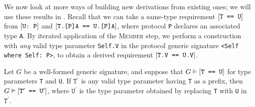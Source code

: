 \documentclass[../generics]{subfiles}
\begin{document}
We now look at more ways of building new derivations from existing ones; we will use these results in . Recall that we can take a same-type requirement $[\texttt{T == U}]$ from $[\texttt{U:~P}]$ and $[\texttt{T.[P]A == U.[P]A}]$, where protocol \texttt{P} declares an associated type \texttt{A}. By iterated application of the \textsc{Member} step, we perform a construction with \emph{any} valid type parameter \texttt{Self.V} in the protocol generic signature \verb|<Self where Self: P>|, to obtain a derived requirement $[\texttt{T.V == U.V}]$.

\begin{lemma}\label{general member type}
Let $G$ be a well-formed generic signature, and suppose that $G\vDash[\texttt{T == U}]$ for type parameters \texttt{T} and \texttt{U}. If $\texttt{T}^\prime$ is any valid type parameter having \texttt{T} as a prefix, then $G\vDash[\texttt{$\texttt{T}^\prime$ == $\texttt{U}^\prime$}]$, where $\texttt{U}^\prime$ is the type parameter obtained by replacing \texttt{T} with \texttt{U} in $\texttt{T}^\prime$.
\end{lemma}
\end{document}
